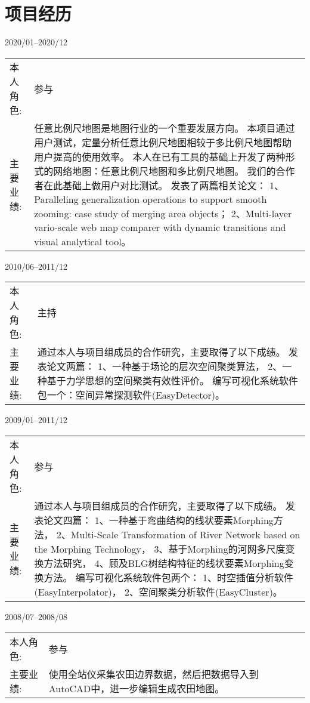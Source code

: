 \documentclass{resume}
\begin{document}
\section{项目经历}
{2020/01--2020/12}
\begin{tabular}{lp{15cm}}			
	本人角色:  & 参与 \\
	主要业绩:  & 任意比例尺地图是地图行业的一个重要发展方向。
                本项目通过用户测试，定量分析任意比例尺地图相较于多比例尺地图帮助用户提高的使用效率。
                本人在已有工具的基础上开发了两种形式的网络地图：任意比例尺地图和多比例尺地图。
                我们的合作者在此基础上做用户对比测试。
                发表了两篇相关论文：
                1、Paralleling generalization operations to support smooth zooming: 
                case study of merging area objects；
                2、Multi-layer vario-scale web map comparer with dynamic transitions and 
                visual analytical tool。
\end{tabular}%
%
{2010/06--2011/12}
\begin{tabular}{lp{15cm}}	
	本人角色:  & 主持 \\
	主要业绩:  & 通过本人与项目组成员的合作研究，主要取得了以下成绩。
                发表论文两篇：
                1、一种基于场论的层次空间聚类算法，
                2、一种基于力学思想的空间聚类有效性评价。
                编写可视化系统软件包一个：空间异常探测软件(EasyDetector)。
\end{tabular}
%
{2009/01--2011/12}
\begin{tabular}{lp{15cm}}	
	本人角色:  & 参与 \\
	主要业绩:  & 通过本人与项目组成员的合作研究，主要取得了以下成绩。
                发表论文四篇：
                1、一种基于弯曲结构的线状要素Morphing方法，
                2、Multi-Scale Transformation of River Network based on the Morphing Technology，
                3、基于Morphing的河网多尺度变换方法研究，
                4、顾及BLG树结构特征的线状要素Morphing变换方法。
                编写可视化系统软件包两个：
                1、时空插值分析软件(EasyInterpolator)，
                2、空间聚类分析软件(EasyCluster)。                
\end{tabular}
%
{2008/07--2008/08}
\begin{tabular}{lp{15cm}}	
	本人角色:  & 参与 \\
	主要业绩:  & 使用全站仪采集农田边界数据，然后把数据导入到AutoCAD中，进一步编辑生成农田地图。                
\end{tabular}
\end{document}
